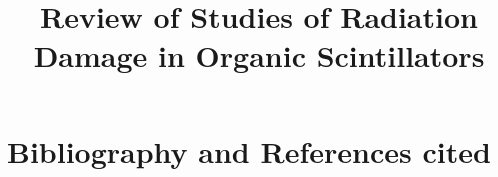 \documentclass[12pt]{article}
\begin{document}
\title{Review of Studies of Radiation Damage in Organic Scintillators}
\date{}
\maketitle
\thispagestyle{empty}

\newpage






\newpage
\section{Bibliography and References cited}


\end{document}
